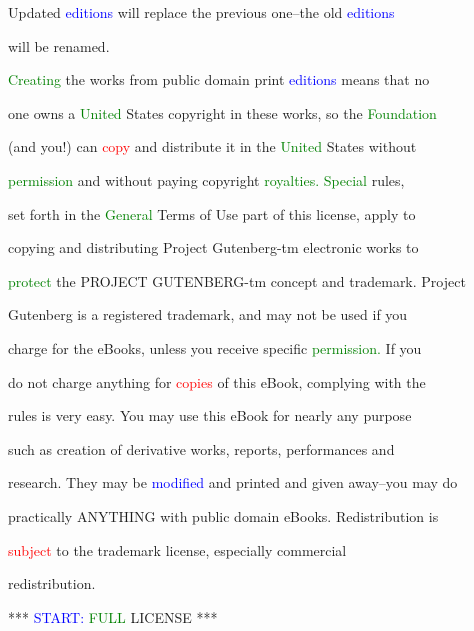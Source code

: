  Updated \textcolor{blue}{editions} will replace the previous one--the old \textcolor{blue}{editions}

 will be renamed.



 \textcolor{green}{Creating} the works from \textcolor{BurntOrange}{public} domain print \textcolor{blue}{editions} means that no

 one owns a \textcolor{green}{United} States copyright in these works, so the \textcolor{green}{Foundation}

 (and you!) can \textcolor{red}{copy} and distribute it in the \textcolor{green}{United} States without

 \textcolor{green}{permission} and without \textcolor{BurntOrange}{paying} copyright \textcolor{green}{royalties.} \textcolor{green}{Special} \textcolor{BurntOrange}{rules,}

 set forth in the \textcolor{green}{General} Terms of Use part of this license, apply to

 copying and distributing Project Gutenberg-tm electronic works to

 \textcolor{green}{protect} the PROJECT GUTENBERG-tm concept and trademark. Project

 Gutenberg is a registered trademark, and may not be used if you

 charge for the eBooks, unless you receive specific \textcolor{green}{permission.} If you

 do not charge anything for \textcolor{red}{copies} of this eBook, complying with the

 \textcolor{BurntOrange}{rules} is very easy. You may use this eBook for nearly any purpose

 such as creation of derivative works, reports, performances and

 research. They may be \textcolor{blue}{modified} and printed and given away--you may do

 practically ANYTHING with \textcolor{BurntOrange}{public} domain eBooks. Redistribution is

 \textcolor{red}{subject} to the trademark license, especially commercial

 redistribution.







 *** \textcolor{blue}{START:} \textcolor{green}{FULL} LICENSE ***



